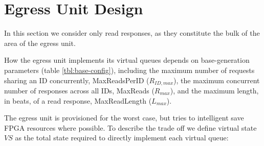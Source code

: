 \begin{table}
\begin{center}
\end{center}
\caption{Generator base configuration parameters.}
\label{tbl:base-config}
\end{table}%

\section{Egress Unit Design}\label{sec:egress}

In this section we consider only read responses, as they constitute the bulk of the area of the egress unit.

How the egress unit implements its virtual queues depends on base-generation
parameters (table \ref{tbl:base-config}), including the maximum number of
requests sharing an ID concurrently,  MaxReadsPerID ($R_{ID,max}$), the maximum
concurrent number of responses across all IDs, MaxReads ($R_{max}$), and the
maximum length, in beats, of a read response, MaxReadLength ($L_{max}$).

The egress unit is provisioned for the worst case, but tries to intelligent
save FPGA resources where possible. To describe the trade off we define virtual
state $VS$ as the total state required to directly implement each virtual
queue:

